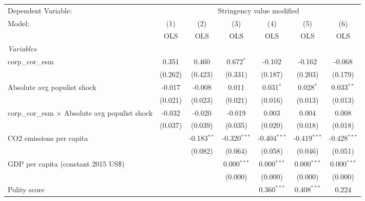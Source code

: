 
\begingroup
\centering
\begin{tabular}{lcccccc}
   \toprule
   Dependent Variable: & \multicolumn{6}{c}{Stringency value modified}\\
   Model:                                                 & (1)     & (2)           & (3)            & (4)            & (5)            & (6)\\  
                                                          &  OLS    & OLS           & OLS            & OLS            & OLS            & OLS\\  
   \midrule
   \emph{Variables}\\
   corp\_cor\_esm                                         & 0.351   & 0.460         & 0.672$^{*}$    & -0.102         & -0.162         & -0.068\\   
                                                          & (0.262) & (0.423)       & (0.331)        & (0.187)        & (0.203)        & (0.179)\\   
   Absolute avg populist shock                            & -0.017  & -0.008        & 0.011          & 0.031$^{*}$    & 0.028$^{*}$    & 0.033$^{**}$\\   
                                                          & (0.021) & (0.023)       & (0.021)        & (0.016)        & (0.013)        & (0.013)\\   
   corp\_cor\_esm $\times$ Absolute avg populist shock    & -0.032  & -0.020        & -0.019         & 0.003          & 0.004          & 0.008\\   
                                                          & (0.037) & (0.039)       & (0.035)        & (0.020)        & (0.018)        & (0.018)\\   
   CO2 emissions per capita                               &         & -0.183$^{**}$ & -0.320$^{***}$ & -0.404$^{***}$ & -0.419$^{***}$ & -0.428$^{***}$\\   
                                                          &         & (0.082)       & (0.064)        & (0.058)        & (0.046)        & (0.051)\\   
   GDP per capita (constant 2015 US\$)                    &         &               & 0.000$^{***}$  & 0.000$^{***}$  & 0.000$^{***}$  & 0.000$^{***}$\\   
                                                          &         &               & (0.000)        & (0.000)        & (0.000)        & (0.000)\\   
   Polity score                                           &         &               &                & 0.360$^{***}$  & 0.408$^{***}$  & 0.224\\   

\end{tabular}
